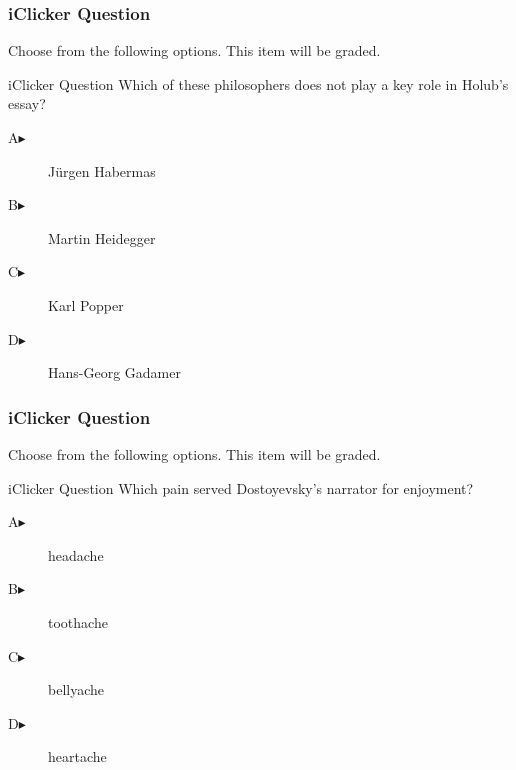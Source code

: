 \documentclass[xcolor=dvipsnames]{beamer}
\begin{document}
\begin{frame}
  \frametitle{iClicker Question}
Choose from the following options. This item will be graded.
\begin{block}{iClicker Question}
Which of these philosophers does not play a key role in Holub's essay?
\end{block}
\begin{description}
\item[A\hspace{.2in}$\blacktriangleright$] J{\"u}rgen Habermas
\item[B\hspace{.2in}$\blacktriangleright$] Martin Heidegger
\item[C\hspace{.2in}$\blacktriangleright$] Karl Popper
\item[D\hspace{.2in}$\blacktriangleright$] Hans-Georg Gadamer
\end{description}
\end{frame}

\begin{frame}
  \frametitle{iClicker Question}
Choose from the following options. This item will be graded.
\begin{block}{iClicker Question}
Which pain served Dostoyevsky's narrator for enjoyment?
\end{block}
\begin{description}
\item[A\hspace{.2in}$\blacktriangleright$] headache
\item[B\hspace{.2in}$\blacktriangleright$] toothache
\item[C\hspace{.2in}$\blacktriangleright$] bellyache
\item[D\hspace{.2in}$\blacktriangleright$] heartache
\end{description}
\end{frame}
\end{document}
